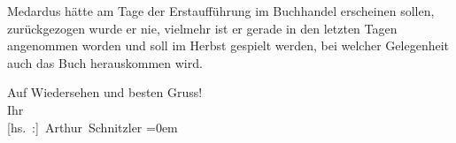 \pstart
           Medardus hätte am Tage der Erstaufführung im
               Buchhandel erscheinen sollen, zurückgezogen wurde er nie, vielmehr ist er gerade in
               den letzten Tagen angenommen worden und soll im Herbst gespielt werden, bei welcher
               Gelegenheit auch das Buch herauskommen wird.\pend
           
\pstart
           Auf Wiedersehen und besten Gruss!{\\[\baselineskip]}Ihr{\\[\baselineskip]}\spacefill\mbox{{[}hs. :{]} Arthur Schnitzler}\pend
           \leftskip=0em{}\endnumbering{}  
      